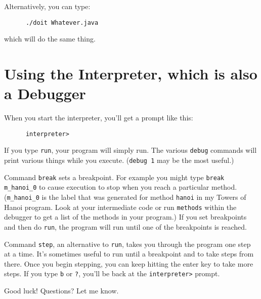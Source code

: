 \documentclass[11pt]{article}
\begin{document}
Alternatively, you can type:
\begin{verbatim}
      ./doit Whatever.java
\end{verbatim}
which will do the same thing.

\section{Using the Interpreter, which is also a Debugger}

When you start the interpreter, you'll get a prompt like this:
\begin{verbatim}
      interpreter>
\end{verbatim}
If you type \verb'run', your program will simply run.  The various \verb'debug' commands will print various things while you execute.  (\verb'debug 1' may be the most useful.)  

Command \verb'break' sets a breakpoint.  For example you might type \verb'break m_hanoi_0' to cause execution to stop when you reach a particular method.  (\verb'm_hanoi_0' is the label that was generated for method \verb'hanoi' in my Towers of Hanoi program.  Look at your intermediate code or run \verb'methods' within the debugger to get a list of the methods in your program.)  If you set breakpoints and then do \verb'run', the program will run until one of the breakpoints is reached.

Command \verb'step', an alternative to \verb'run', takes you through the program one step at a time.  It's sometimes useful to run until a breakpoint and to take steps from there.  Once you begin stepping, you can keep hitting the enter key to take more steps.  If you type \verb'b' or \verb'?', you'll be back at the \verb'interpreter>' prompt.

Good luck!  Questions?  Let me know.
\end{document}

